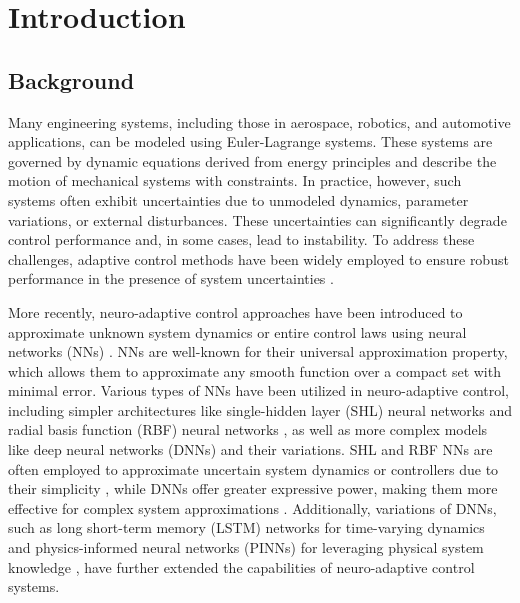 \documentclass[final,5p,times,twocolumn,authoryear]{elsarticle}
\begin{document}
\section{Introduction}

\subsection{Background}

Many engineering systems, including those in aerospace, robotics, and automotive applications, can be modeled using Euler-Lagrange systems. 
These systems are governed by dynamic equations derived from energy principles and describe the motion of mechanical systems with constraints. 
In practice, however, such systems often exhibit uncertainties due to unmodeled dynamics, parameter variations, or external disturbances. 
These uncertainties can significantly degrade control performance and, in some cases, lead to instability. 
To address these challenges, adaptive control methods have been widely employed to ensure robust performance in the presence of system uncertainties \cite{Ioannou:2006aa, Tao:2003aa}.

More recently, neuro-adaptive control approaches have been introduced to approximate unknown system dynamics or entire control laws using neural networks (NNs) \cite{Farrell:2006aa}. 
NNs are well-known for their universal approximation property, which allows them to approximate any smooth function over a compact set with minimal error. 
Various types of NNs have been utilized in neuro-adaptive control, including simpler architectures like single-hidden layer (SHL) neural networks \cite{Ge:2010aa, Yesildirek:1995aa} and radial basis function (RBF) neural networks \cite{Liu:2013ab,Ge:2002aa}, as well as more complex models like deep neural networks (DNNs) \cite{Patil:2022aa} and their variations. 
SHL and RBF NNs are often employed to approximate uncertain system dynamics or controllers due to their simplicity \cite{Esfandiari:2014aa,Esfandiari:2015aa,Yesildirek:1995aa,Gao:2006aa}, while DNNs offer greater expressive power, making them more effective for complex system approximations \cite{Rolnick:2018aa}. 
Additionally, variations of DNNs, such as long short-term memory (LSTM) networks for time-varying dynamics \cite{Liu:2013ab} and physics-informed neural networks (PINNs) for leveraging physical system knowledge \cite{Hart:2024aa}, have further extended the capabilities of neuro-adaptive control systems.
\end{document}
